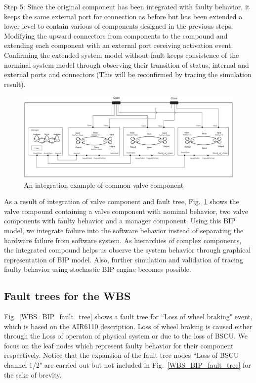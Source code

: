 Step 5: Since the original component has been integrated with faulty behavior, it keeps the same external port for connection  as before but has been extended a lower level to contain various of components designed in the previous steps. Modifying the upward connectors from components to the compound and extending each component with an external port receiving activation event. Confirming the extended system model without fault keeps consistence of the norminal system model through observing their transition of status, internal and external ports and connectors (This will be reconfirmed by tracing the simulation result).

\begin{figure}[t]
	\centerline{\includegraphics[width=125mm]{figure/Example.eps}}
	\caption{An integration example of common valve component}
	\label{Example}
\end{figure}

As a result of integration of valve component and fault tree, Fig.~\ref{Example} shows the valve compound containing a valve component with nominal behavior, two valve components with faulty behavior and a manager component. Using this BIP model, we integrate failure into the software behavior instead of separating the hardware failure from software system. As hierarchies of complex components, the integrated compound helps us observe the system behavior through graphical representation of BIP model. Also, further simulation and validation of tracing faulty behavior using stochastic BIP engine becomes possible.


\subsection{Fault trees for the WBS}
Fig.~\ref{WBS_BIP_fault_tree} shows a fault tree for ``Loss of wheel braking" event, which is based on the AIR6110 description. Loss of wheel braking is caused either through the Loss of operaton of physical system or due to the loss of BSCU. We focus on the leaf nodes which represent faulty behavior for their component respectively. Notice that the expansion of the fault tree nodes ``Loss of BSCU channel 1/2" are carried out but not included in Fig.~\ref{WBS_BIP_fault_tree} for the sake of brevity.

